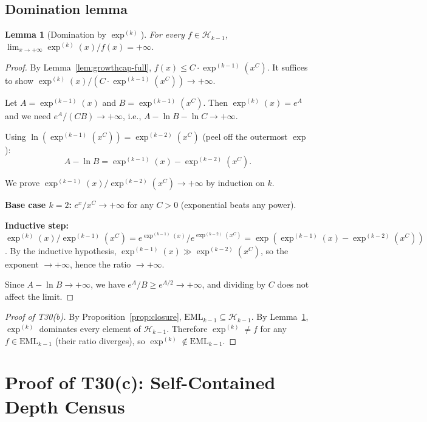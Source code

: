 \documentclass[12pt,a4paper]{article}
\newtheorem{lemma}[theorem]{Lemma}
\theoremstyle{definition}
\theoremstyle{remark}
\begin{document}
\subsection{Domination lemma}

\begin{lemma}[Domination by $\exp^{(k)}$]\label{lem:dom}
For every $f \in \mathcal{H}_{k-1}$,
$\lim_{x \to +\infty} \exp^{(k)}(x) / f(x) = +\infty$.
\end{lemma}

\begin{proof}
By Lemma~\ref{lem:growthcap-full}, $f(x) \leq C \cdot \exp^{(k-1)}(x^C)$.
It suffices to show $\exp^{(k)}(x) / (C \cdot \exp^{(k-1)}(x^C)) \to +\infty$.

Let $A = \exp^{(k-1)}(x)$ and $B = \exp^{(k-1)}(x^C)$.
Then $\exp^{(k)}(x) = e^A$ and we need $e^A / (CB) \to +\infty$,
i.e., $A - \ln B - \ln C \to +\infty$.

Using $\ln(\exp^{(k-1)}(x^C)) = \exp^{(k-2)}(x^C)$ (peel off the outermost $\exp$):
\[
  A - \ln B = \exp^{(k-1)}(x) - \exp^{(k-2)}(x^C).
\]

We prove $\exp^{(k-1)}(x) / \exp^{(k-2)}(x^C) \to +\infty$ by induction on $k$.

\textbf{Base case $k = 2$:} $e^x / x^C \to +\infty$ for any $C > 0$
(exponential beats any power).

\textbf{Inductive step:}
$\exp^{(k)}(x) / \exp^{(k-1)}(x^C)
= e^{\exp^{(k-1)}(x)} / e^{\exp^{(k-2)}(x^C)}
= \exp(\exp^{(k-1)}(x) - \exp^{(k-2)}(x^C))$.
By the inductive hypothesis, $\exp^{(k-1)}(x) \gg \exp^{(k-2)}(x^C)$,
so the exponent $\to +\infty$, hence the ratio $\to +\infty$.

Since $A - \ln B \to +\infty$, we have $e^A / B \geq e^{A/2} \to +\infty$,
and dividing by $C$ does not affect the limit.
\end{proof}

\begin{proof}[Proof of T30(b)]
By Proposition~\ref{prop:closure}, $\mathrm{EML}_{k-1} \subseteq \mathcal{H}_{k-1}$.
By Lemma~\ref{lem:dom}, $\exp^{(k)}$ dominates every element of $\mathcal{H}_{k-1}$.
Therefore $\exp^{(k)} \neq f$ for any $f \in \mathrm{EML}_{k-1}$
(their ratio diverges), so $\exp^{(k)} \notin \mathrm{EML}_{k-1}$.
\end{proof}

\section{Proof of T30(c): Self-Contained Depth Census}
\label{sec:census}
\end{document}
